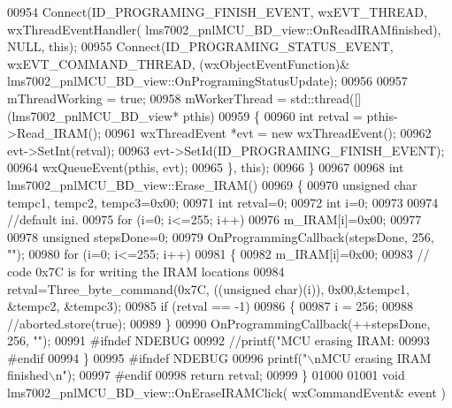 \begin{DoxyCode}
{{{{{{{{{{{{{{{{00954     Connect(ID_PROGRAMING_FINISH_EVENT, wxEVT\_THREAD, wxThreadEventHandler(
      lms7002_pnlMCU_BD_view::OnReadIRAMfinished), NULL, \textcolor{keyword}{this});
00955     Connect(ID_PROGRAMING_STATUS_EVENT, wxEVT\_COMMAND\_THREAD, (wxObjectEventFunction)&
      lms7002_pnlMCU_BD_view::OnProgramingStatusUpdate);
00956 
00957     mThreadWorking = \textcolor{keyword}{true};
00958     mWorkerThread = std::thread([](lms7002_pnlMCU_BD_view* pthis)
00959         \{
00960             \textcolor{keywordtype}{int} retval = pthis->Read_IRAM();
00961             wxThreadEvent *evt = \textcolor{keyword}{new} wxThreadEvent();
00962             evt->SetInt(retval);
00963             evt->SetId(ID_PROGRAMING_FINISH_EVENT);
00964             wxQueueEvent(pthis, evt);
00965         \}, \textcolor{keyword}{this});
00966 \}
00967 
00968 \textcolor{keywordtype}{int} lms7002_pnlMCU_BD_view::Erase_IRAM()
00969 \{
00970     \textcolor{keywordtype}{unsigned} \textcolor{keywordtype}{char} tempc1, tempc2, tempc3=0x00;
00971     \textcolor{keywordtype}{int} retval=0;
00972     \textcolor{keywordtype}{int} i=0;
00973 
00974     \textcolor{comment}{//default ini.}
00975     \textcolor{keywordflow}{for} (i=0; i<=255; i++)
00976             m_IRAM[i]=0x00;
00977 
00978     \textcolor{keywordtype}{unsigned} stepsDone=0;
00979     OnProgrammingCallback(stepsDone, 256, \textcolor{stringliteral}{""});
00980     \textcolor{keywordflow}{for} (i=0; i<=255; i++)
00981     \{
00982             m_IRAM[i]=0x00;
00983             \textcolor{comment}{// code 0x7C is for writing the IRAM locations}
00984             retval=Three_byte_command(0x7C, ((\textcolor{keywordtype}{unsigned} \textcolor{keywordtype}{char})(i)), 0x00,&tempc1, &tempc2, &tempc3);
00985             \textcolor{keywordflow}{if} (retval == -1)
00986             \{
00987                 i = 256;
00988                 \textcolor{comment}{//aborted.store(true);}
00989             \}
00990             OnProgrammingCallback(++stepsDone, 256, \textcolor{stringliteral}{""});
00991 \textcolor{preprocessor}{#ifndef NDEBUG}
00992             \textcolor{comment}{//printf("MCU erasing IRAM: %
00993 \textcolor{preprocessor}{#endif}
00994     \}
00995 \textcolor{preprocessor}{#ifndef NDEBUG}
00996     printf(\textcolor{stringliteral}{"\(\backslash\)nMCU erasing IRAM finished\(\backslash\)n"});
00997 \textcolor{preprocessor}{#endif}
00998     \textcolor{keywordflow}{return} retval;
00999 \}
01000 
01001 \textcolor{keywordtype}{void} lms7002_pnlMCU_BD_view::OnEraseIRAMClick( wxCommandEvent& event )
}}}}}}}}}}}}}}}}}
\end{DoxyCode}
